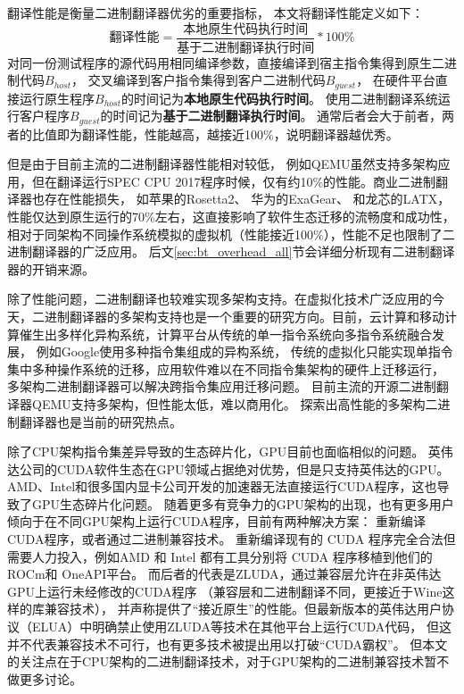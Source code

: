 翻译性能是衡量二进制翻译器优劣的重要指标，
本文将翻译性能定义如下：
\begin{equation}\label{eq:bt_performance}
    \text{翻译性能} = \frac{\text{本地原生代码执行时间}}{\text{基于二进制翻译执行时间}} * 100\%
\end{equation}
对同一份测试程序的源代码用相同编译参数，直接编译到宿主指令集得到原生二进制代码$B_{host}$，
交叉编译到客户指令集得到客户二进制代码$B_{guest}$，
在硬件平台直接运行原生程序$B_{host}$的时间记为\textbf{本地原生代码执行时间}。
使用二进制翻译系统运行客户程序$B_{guest}$的时间记为\textbf{基于二进制翻译执行时间}。
通常后者会大于前者，两者的比值即为翻译性能，性能越高，越接近100\%，说明翻译器越优秀。


但是由于目前主流的二进制翻译器性能相对较低，
例如QEMU\cite{bellardQEMUFastPortable2005}虽然支持多架构应用，但在翻译运行SPEC CPU 2017\cite{SPECCPU2017}程序时候，仅有约10\%的性能。商业二进制翻译器也存在性能损失，
如苹果的Rosetta2\cite{RosettaTranslationEnvironment, RunningIntelBinaries}、
华为的ExaGear\cite{KunPengExaGear}、
和龙芯的LATX\cite{LoongArchEnv2022, LoongArch2023}，
性能仅达到原生运行的70\%左右，这直接影响了软件生态迁移的流畅度和成功性，
相对于同架构不同操作系统模拟的虚拟机（性能接近100\%），性能不足也限制了二进制翻译器的广泛应用。
后文\ref{sec:bt_overhead_all}节会详细分析现有二进制翻译器的开销来源。

除了性能问题，二进制翻译也较难实现多架构支持。在虚拟化技术广泛应用的今天，二进制翻译器的多架构支持也是一个重要的研究方向。目前，云计算和移动计算催生出多样化异构系统，计算平台从传统的单一指令系统向多指令系统融合发展，
例如Google使用多种指令集组成的异构系统，
传统的虚拟化只能实现单指令集中多种操作系统的迁移，应用软件难以在不同指令集架构的硬件上迁移运行，
多架构二进制翻译器可以解决跨指令集应用迁移问题。
目前主流的开源二进制翻译器QEMU支持多架构，但性能太低，难以商用化。
探索出高性能的多架构二进制翻译器也是当前的研究热点。

除了CPU架构指令集差异导致的生态碎片化，GPU目前也面临相似的问题。
英伟达公司的CUDA软件生态在GPU领域占据绝对优势，但是只支持英伟达的GPU。
AMD、Intel和很多国内显卡公司开发的加速器无法直接运行CUDA程序，这也导致了GPU生态碎片化问题。
随着更多有竞争力的GPU架构的出现，也有更多用户倾向于在不同GPU架构上运行CUDA程序，目前有两种解决方案：
重新编译CUDA程序，或者通过二进制兼容技术。
重新编译现有的 CUDA 程序完全合法但需要人力投入，例如AMD 和 Intel 都有工具分别将 CUDA 程序移植到他们的 ROCm和 OneAPI平台。
而后者的代表是ZLUDA\cite{ZLUDA}，通过兼容层允许在非英伟达GPU上运行未经修改的CUDA程序
（兼容层和二进制翻译不同，更接近于Wine这样的库兼容技术），
并声称提供了“接近原生”的性能。但最新版本的英伟达用户协议（ELUA）中明确禁止使用ZLUDA等技术在其他平台上运行CUDA代码，
但这并不代表兼容技术不可行，也有更多技术被提出用以打破“CUDA霸权”。
但本文的关注点在于CPU架构的二进制翻译技术，对于GPU架构的二进制兼容技术暂不做更多讨论。



